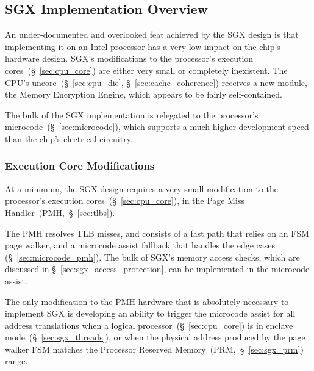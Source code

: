 \subsection{SGX Implementation Overview}
\label{sec:sgx_implementation_overview}


An under-documented and overlooked feat achieved by the SGX design is that
implementing it on an Intel processor has a very low impact on the chip's
hardware design. SGX's modifications to the processor's execution
cores~(\S~\ref{sec:cpu_core}) are either very small or completely inexistent.
The CPU's uncore~(\S~\ref{sec:cpu_die}, \S~\ref{sec:cache_coherence}) receives
a new module, the  Memory Encryption Engine, which appears to be fairly
self-contained.

The bulk of the SGX implementation is relegated to the processor's
microcode~(\S~\ref{sec:microcode}), which supports a much higher development
speed than the chip's electrical circuitry.


\subsubsection{Execution Core Modifications}
\label{sec:sgx_core_modifications}


At a minimum, the SGX design requires a very small modification to the
processor's execution cores~(\S~\ref{sec:cpu_core}), in the Page Miss
Handler~(PMH,~\S~\ref{sec:tlbs}).

The PMH resolves TLB misses, and consists of a fast path that relies on an FSM
page walker, and a microcode assist fallback that handles the edge cases
(\S~\ref{sec:microcode_pmh}). The bulk of SGX's memory access checks, which are
discussed in \S~\ref{sec:sgx_access_protection}, can be implemented in the
microcode assist.

The only modification to the PMH hardware that is absolutely necessary to
implement SGX is developing an ability to trigger the microcode assist for all
address translations when a logical processor~(\S~\ref{sec:cpu_core}) is in
enclave mode~(\S~\ref{sec:sgx_threads}), or when the physical address produced
by the page walker FSM matches the Processor Reserved
Memory~(PRM,~\S~\ref{sec:sgx_prm}) range.

